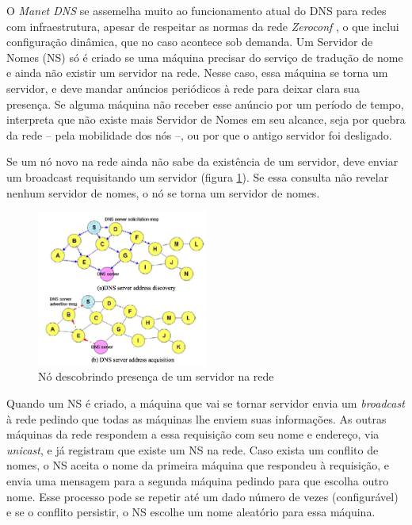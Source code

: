     O \textit{Manet DNS} se assemelha muito ao funcionamento atual do DNS para 
    redes com infraestrutura, apesar de respeitar as normas da rede \textit{Zeroconf}
    \cite{zeroconf}, o que inclui configuração dinâmica, que no caso acontece sob
    demanda. Um Servidor de Nomes (NS) só é criado se uma máquina precisar do 
    serviço de tradução de nome e ainda não existir um servidor na rede. Nesse 
    caso, essa máquina se torna um servidor, e deve mandar anúncios periódicos à
    rede para deixar clara sua presença. Se alguma máquina não receber esse
    anúncio por um período de tempo, interpreta que não existe mais Servidor de 
    Nomes em seu alcance, seja por quebra da rede -- pela mobilidade dos nós --,
    ou por que o antigo servidor foi desligado.

    Se um nó novo na rede ainda não sabe da existência de um servidor, deve enviar
    um broadcast requisitando um servidor (figura \ref{centralized}). Se essa
    consulta não revelar nenhum servidor de nomes, o nó se torna um servidor de
    nomes.
    
    \begin{figure}[h!]
        \centering
        \includegraphics[width=0.5\textwidth]{figures/centralized}
        \caption{Nó descobrindo presença de um servidor na rede}
        \label{centralized}
    \end{figure}

    Quando um NS é criado, a máquina que vai se tornar servidor envia um 
    \textit{broadcast} à rede pedindo que todas as máquinas lhe enviem suas 
    informações. As outras máquinas da rede respondem a essa requisição com seu 
    nome e endereço, via \textit{unicast}, e já registram que existe um NS na rede.
    Caso exista um conflito de nomes, o NS aceita o nome da primeira máquina que
    respondeu à requisição, e envia uma mensagem para a segunda máquina pedindo
    para que escolha outro nome. Esse processo pode se repetir até um dado número
    de vezes (configurável) e se o conflito persistir, o NS escolhe um nome 
    aleatório para essa máquina.
  
